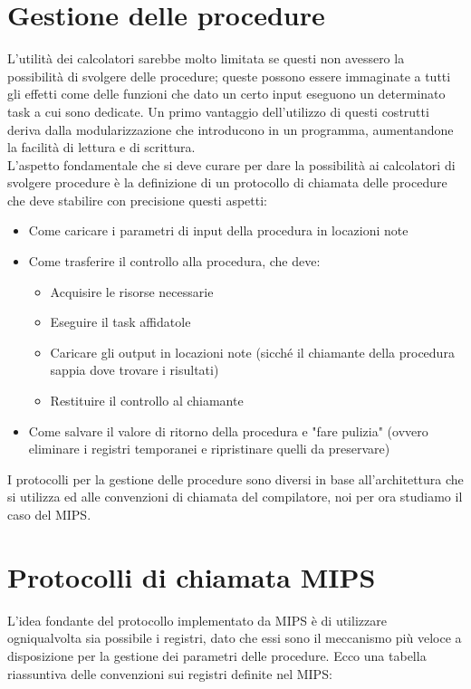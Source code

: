 \documentclass[class=book, crop=false]{standalone}
\begin{document}

\section{Gestione delle procedure}
L'utilità dei calcolatori sarebbe molto limitata se questi non avessero la possibilità di svolgere delle procedure; queste possono essere immaginate a tutti gli effetti come delle funzioni che dato un certo input eseguono un determinato task a cui sono dedicate. Un primo vantaggio dell'utilizzo di questi costrutti deriva dalla modularizzazione che introducono in un programma, aumentandone la facilità di lettura e di scrittura.\\
L'aspetto fondamentale che si deve curare per dare la possibilità ai calcolatori di svolgere procedure è la definizione di un protocollo di chiamata delle procedure che deve stabilire con precisione questi aspetti:
\begin{itemize}[noitemsep]
	\item Come caricare i parametri di input della procedura in locazioni note
	\item Come trasferire il controllo alla procedura, che deve:
		\begin{itemize}[nolistsep, noitemsep]
			\item Acquisire le risorse necessarie
			\item Eseguire il task affidatole
			\item Caricare gli output in locazioni note (sicché il chiamante della procedura sappia dove trovare i risultati)
			\item Restituire il controllo al chiamante
		\end{itemize}
	\item Come salvare il valore di ritorno della procedura e "fare pulizia"  (ovvero eliminare i registri temporanei  e ripristinare quelli da preservare)
\end{itemize}
I protocolli per la gestione delle procedure sono diversi in base all'architettura che si utilizza ed alle convenzioni di chiamata del compilatore, noi per ora studiamo il caso del MIPS.

\section{Protocolli di chiamata MIPS}
L'idea fondante del protocollo implementato da MIPS è di utilizzare ogniqualvolta sia possibile i registri, dato che essi sono il meccanismo più veloce a disposizione per la gestione dei parametri delle procedure. Ecco una tabella riassuntiva delle convenzioni sui registri definite nel MIPS:
\end{document}
